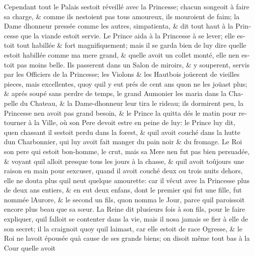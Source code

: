 \documentclass[14pt,a4paper]{memoir}
\begin{document}
{{\begin{otherlanguage}{french}
Cependant tout le Palais s\textquotesingle estoit réveillé avec la
Princesse; chacun songeoit à faire sa charge, \& comme ils
n\textquotesingle estoient pas tous amoureux, ils mouroient de faim; la
Dame d\textquotesingle honneur pressée comme les autres,
s\textquotesingle impatienta, \& dit tout haut à la Princesse que la
viande estoit servie. Le Prince aida à la Princesse à se lever; elle
estoit tout habillée \& fort magnifiquement; mais il se garda bien de
luy dire qu\textquotesingle elle estoit habillée comme ma mere grand, \&
qu\textquotesingle elle avoit un collet monté, elle n\textquotesingle en
estoit pas moins belle. Ils passerent dans un Salon de miroirs, \& y
souperent, servis par les Officiers de la Princesse; les Violons \& les
Hautbois joüerent de vieilles pieces, mais excellentes, quoy
qu\textquotesingle il y eut prés de cent ans qu\textquotesingle on ne
les joüast plus; \& aprés soupé sans perdre de temps, le grand Aumonier
les maria dans la Chapelle du Chateau, \& la
Dame-d\textquotesingle honneur leur tira le rideau; ils dormirent peu,
la Princesse n\textquotesingle en avoit pas grand besoin, \& le Prince
la quitta dés le matin pour retourner à la Ville, où son Pere devoit
estre en peine de luy: le Prince luy dit, qu\textquotesingle en chassant
il s\textquotesingle estoit perdu dans la forest, \&
qu\textquotesingle il avoit couché dans la hutte d\textquotesingle un
Charbonnier, qui luy avoit fait manger du pain noir \& du fromage. Le
Roi son pere qui estoit bon-homme, le crut, mais sa Mere
n\textquotesingle en fut pas bien persuadée, \& voyant
qu\textquotesingle il alloit presque tous les jours à la chasse, \&
qu\textquotesingle il avoit toûjours une raison en main pour
s\textquotesingle excuser, quand il avoit couché deux ou trois nuits
dehors, elle ne douta plus qu\textquotesingle il n\textquotesingle eut
quelque amourette: car il vêcut avec la Princesse plus de deux ans
entiers, \& en eut deux enfans, dont le premier qui fut une fille, fut
nommée l\textquotesingle Aurore, \& le second un fils,
qu\textquotesingle on nomma le Jour, parce qu\textquotesingle il
paroissoit encore plus beau que sa sœur. La Reine dit plusieurs fois à
son fils, pour le faire expliquer, qu\textquotesingle il falloit se
contenter dans la vie, mais il n\textquotesingle osa jamais se fier à
elle de son secret; il la craignoit quoy qu\textquotesingle il
l\textquotesingle aimast, car elle estoit de race Ogresse, \& le Roi ne
l\textquotesingle avoit épousée qu\textquotesingle à cause de ses grands
biens; on disoit même tout bas à la Cour qu\textquotesingle elle avoit

\end{otherlanguage}}}
\end{document}
